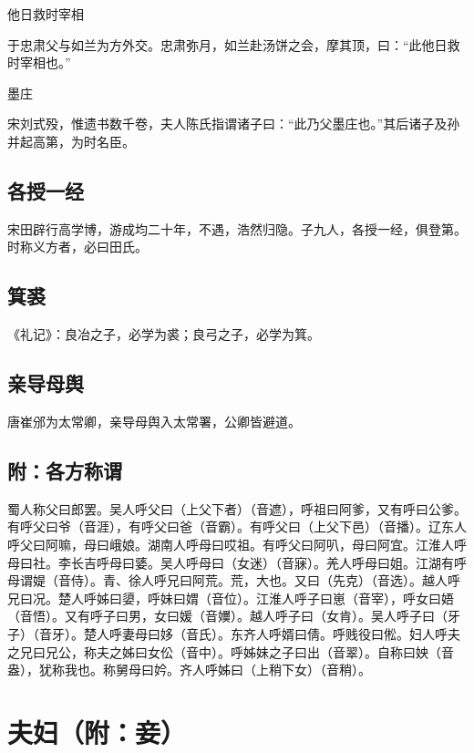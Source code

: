 \documentclass[a4paper,12pt,UTF8,twoside]{ctexbook}
\begin{document}
    他日救时宰相
    
    于忠肃父与如兰为方外交。忠肃弥月，如兰赴汤饼之会，摩其顶，曰：“此他日救时宰相也。”
    
    墨庄
    
    宋刘式殁，惟遗书数千卷，夫人陈氏指谓诸子曰：“此乃父墨庄也。”其后诸子及孙并起高第，为时名臣。
    
    \section{各授一经}
    
    宋田辟行高学博，游成均二十年，不遇，浩然归隐。子九人，各授一经，俱登第。时称义方者，必曰田氏。
    
    \section{箕裘}
    
    《礼记》：良冶之子，必学为裘；良弓之子，必学为箕。
    
    \section{亲导母舆}
    
    唐崔邠为太常卿，亲导母舆入太常署，公卿皆避道。
    
    \section{附：各方称谓}
    
    蜀人称父曰郎罢。吴人呼父曰（上父下者）（音遮），呼祖曰阿爹，又有呼曰公爹。有呼父曰爷（音涯），有呼父曰爸（音霸）。有呼父曰（上父下邑）（音播）。辽东人呼父曰阿嘛，母曰峨娘。湖南人呼母曰哎祖。有呼父曰阿叭，母曰阿宜。江淮人呼母曰社。李长吉呼母曰婱。吴人呼母曰（女迷）（音寐）。羌人呼母曰姐。江湖有呼母谓媞（音侍）。青、徐人呼兄曰阿荒。荒，大也。又曰（先克）（音选）。越人呼兄曰况。楚人呼姊曰嬃，呼妹曰媦（音位）。江淮人呼子曰崽（音宰），呼女曰娪（音悟）。又有呼子曰男，女曰媛（音嬽）。越人呼子曰（女肯）。吴人呼子曰（牙子）（音牙）。楚人呼妻母曰姼（音氏）。东齐人呼婿曰倩。呼贱役曰倯。妇人呼夫之兄曰兄公，称夫之姊曰女伀（音中）。呼姊妹之子曰出（音翠）。自称曰姎（音盎），犹称我也。称舅母曰妗。齐人呼姊曰（上稍下女）（音稍）。
    
    \chapter{夫妇（附：妾）}
    
\end{document}
